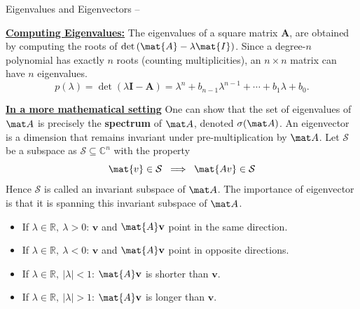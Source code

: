 \begin{frame}{Eigenvalues and Eigenvectors --}
    \begin{alertblock}{\textbf{\underline{Computing Eigenvalues:}}}\medskip
        The eigenvalues of a square matrix $\mathbf{A}$, are obtained by computing the roots of $\det\left(\mat{A} - \lambda \mat{I}\right)$. Since a degree-$n$ polynomial has exactly $n$ roots (counting multiplicities), an $n \times n$ matrix can have $n$ eigenvalues.
        \[
            p(\lambda)
            = \det(\lambda\mathbf{I} - \mathbf{A})
            = \lambda^n + b_{n-1}\lambda^{n-1} + \cdots + b_1\lambda + b_0.
        \]
    \end{alertblock}

    \bigskip
    \begin{alertblock}{\textbf{\underline{In a more mathematical setting}}}\medskip
        One can show that the set of eigenvalues of $\mat A$ is precisely the \textbf{spectrum} of $\mat A$, denoted $\sigma(\mat A)$.
        An eigenvector is a dimension that remains invariant under pre-multiplication by $\mat A$.
        \medskip
        Let $\mathcal{S}$ be a subspace as $\mathcal{S} \subseteq \mathbb{C}^n$ with the property
        \[
            \mat{v} \in \mathcal{S} \;\;\Longrightarrow\;\; \mat{A v} \in \mathcal{S}
        \]
        Hence $\mathcal{S}$ is called an \alert{invariant subspace} of $\mat A$. The importance of eigenvector is that it is spanning this invariant subspace of $\mat A$.
    \end{alertblock}

    \bigskip
    \begin{itemize}
        \item If $\lambda \in \mathbb{R},\ \lambda > 0$:
              $\mathbf{v}$ and $\mat{A}\mathbf{v}$ point in the same direction.
        \item If $\lambda \in \mathbb{R},\ \lambda < 0$:
              $\mathbf{v}$ and $\mat{A}\mathbf{v}$ point in opposite directions.
        \item If $\lambda \in \mathbb{R},\ |\lambda| < 1$:
              $\mat{A}\mathbf{v}$ is shorter than $\mathbf{v}$.
        \item If $\lambda \in \mathbb{R},\ |\lambda| > 1$:
              $\mat{A}\mathbf{v}$ is longer than $\mathbf{v}$.
    \end{itemize}

\end{frame}



